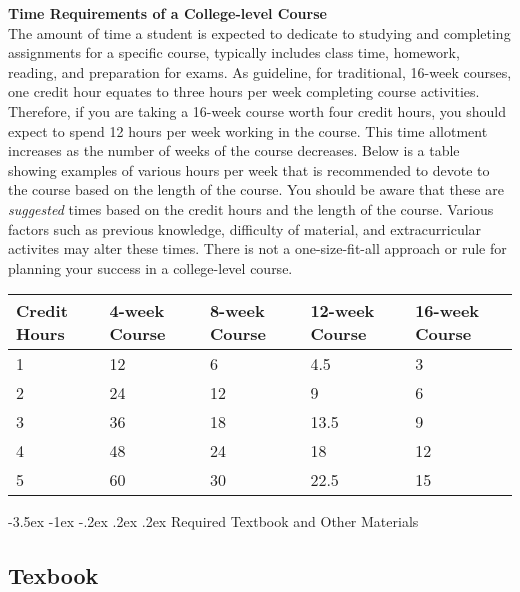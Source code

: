 \documentclass{article}
\makeatletter
\renewcommand\section{\@startsection{section}{1}{0pt}%
  {-3.5ex \@plus -1ex \@minus -.2ex}%
  {.2ex \@plus.2ex}%
  {\normalfont\Large\bfseries}} %
\renewenvironment{framed}[1][]{%
  \def\FrameCommand{%
    \hspace{1pt}%
    {\color{mybordercolor}\vrule width 2pt} %
    \hspace{1pt}%
    \fboxsep=\FrameSep%
    \colorbox{mybgcolor}%
  }%
  \MakeFramed {\advance\hsize-\width \FrameRestore}%
}{%
  \endMakeFramed
}
\makeatother
\begin{document}
\begin{framed}
\textbf{Time Requirements of a College-level Course}\\
The amount of time a student is expected to dedicate to studying and completing assignments for a specific course, typically includes class time, homework, reading, and preparation for exams. As guideline, for traditional, 16-week courses, one credit hour equates to three hours per week completing course activities. Therefore, if you are taking a 16-week course worth four credit hours, you should expect to spend 12 hours per week working in the course. This time allotment increases as the number of weeks of the course decreases. Below is a table showing examples of various hours per week that is recommended to devote to the course based on the length of the course. You should be aware that these are \textit{suggested} times based on the credit hours and the length of the course. Various factors such as previous knowledge, difficulty of material, and extracurricular activites may alter these times. There is not a one-size-fit-all approach or rule for planning your success in a college-level course.

\bigskip\noindent
\begin{tabular}{p{}p{}p{}p{}p{}}
\toprule
Credit Hours & 4-week Course & 8-week Course & 12-week Course & 16-week Course \\
\hline
1 & 12 & 6 & 4.5 & 3 \\
2 & 24 & 12 & 9 & 6 \\
3 & 36 & 18 & 13.5 & 9 \\
4 & 48 & 24 & 18 & 12 \\
5 & 60 & 30 & 22.5 & 15 \\
\bottomrule
\end{tabular}

\bigskip
\end{framed}

\section{Required Textbook and Other Materials}

\subsection{Texbook}
\end{document}
